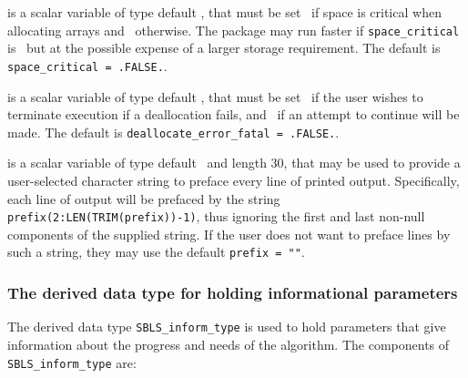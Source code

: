 \documentclass{galahad}
\newcommand{\packagename}{SBLS}
\begin{document}
\begin{description}
 is a scalar variable of type default \logical,
that must be set \true\ if space is critical when allocating arrays
and  \false\ otherwise. The package may run faster if
{\tt space\_critical} is \false\ but at the possible expense of a larger
storage requirement. The default is {\tt space\_critical = .FALSE.}.

 is a scalar variable of type default \logical,
that must be set \true\ if the user wishes to terminate execution if
a deallocation  fails, and \false\ if an attempt to continue
will be made. The default is {\tt deallocate\_error\_fatal = .FALSE.}.

 is a scalar variable of type default \character\
and length 30, that may be used to provide a user-selected
character string to preface every line of printed output.
Specifically, each line of output will be prefaced by the string
{\tt prefix(2:LEN(TRIM(prefix))-1)},
thus ignoring the first and last non-null components of the
supplied string. If the user does not want to preface lines by such
a string, they may use the default {\tt prefix = ""}.

\end{description}


\subsubsection{The derived data type for holding informational
 parameters}\label{typeinform}
The derived data type
{\tt \packagename\_inform\_type}
is used to hold parameters that give information about the progress and needs
of the algorithm. The components of
{\tt \packagename\_inform\_type}
are:
\end{document}
